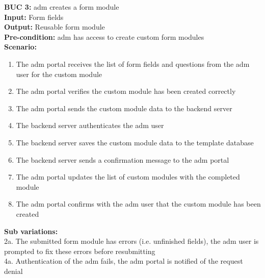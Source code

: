 \documentclass[12pt]{article}
\begin{document}
\noindent\textbf{BUC 3: } \Gls{adm} creates a form module \\
\textbf{Input:} Form fields \\
\textbf{Output:} Reusable form module \\
\textbf{Pre-condition:} \Gls{adm} has access to create custom form modules \\
\textbf{Scenario:} \\
\begin{enumerate}
  \item The \gls{adm} portal receives the list of form fields and questions from the \gls{adm} user for the custom module
  \item The \gls{adm} portal verifies the custom module has been created correctly
  \item The \gls{adm} portal sends the custom module data to the backend server
  \item The backend server authenticates the \gls{adm} user
  \item The backend server saves the custom module data to the template database
  \item The backend server sends a confirmation message to the \gls{adm} portal
  \item The \gls{adm} portal updates the list of custom modules with the completed module
  \item The \gls{adm} portal confirms with the \gls{adm} user that the custom module has been created
\end{enumerate}
\textbf{Sub variations:} \\
2a. The submitted form module has errors (i.e. unfinished fields), the \gls{adm} user is prompted to fix these errors before resubmitting \\
4a. Authentication of the \gls{adm} fails, the \gls{adm} portal is notified of the request denial \\
\end{document}
